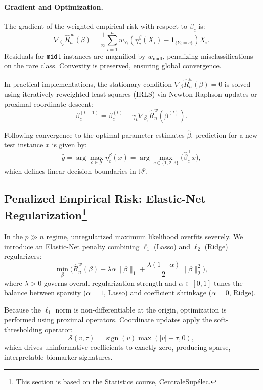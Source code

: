 \documentclass[a4paper,11pt]{paper}
\theoremstyle{plain}
\theoremstyle{definition}
\theoremstyle{remark}
\begin{document}
\paragraph{Gradient and Optimization.}
The gradient of the weighted empirical risk with respect to $\beta_c$ is:
$$
    \nabla_{\beta_c} \hat{R}_n^{\,w}(\beta) = \frac{1}{n} \sum_{i=1}^n w_{Y_i}\left( \eta_c^\beta(X_i) - \mathbf{1}_{\{Y_i = c\}} \right) X_i.
$$
Residuals for \texttt{midl} instances are magnified by $w_{\text{midl}}$, penalizing misclassifications on the rare class. Convexity is preserved, ensuring global convergence.

In practical implementations, the stationary condition $\nabla_\beta \hat R_n^w(\beta) = 0$ is solved using iteratively reweighted least squares (IRLS) via Newton-Raphson updates or proximal coordinate descent:
$$\beta_c^{(t+1)} = \beta_c^{(t)} - \gamma_t \nabla_{\beta_c} \hat R_n^w(\beta^{(t)}).$$

Following convergence to the optimal parameter estimates $\hat \beta$, prediction for a new test instance $x$ is given by:
$$\hat{y} = \arg\max_{c \in \mathcal{Y}} \eta_c^{\hat{\beta}}(x) = \arg\max_{c \in \{1, 2, 3\}} \big(\hat{\beta}_c^\top x\big),$$
which defines linear decision boundaries in $\mathbb{R}^p$.

\subsection{Penalized Empirical Risk: Elastic-Net Regularization\texorpdfstring{\protect\footnote{This section is based on the Statistics course, CentraleSupélec.}}{}}

In the $p \gg n$ regime, unregularized maximum likelihood overfits severely. We introduce an Elastic-Net penalty combining $\ell_1$ (Lasso) and $\ell_2$ (Ridge) regularizers:
$$\min_{\beta} \bigg( \hat R_n^w(\beta) + \lambda \alpha \|\beta\|_1 + \frac{\lambda (1 - \alpha)}{2} \|\beta\|_2^2 \bigg),$$
where $\lambda > 0$ governs overall regularization strength and $\alpha \in [0, 1]$ tunes the balance between sparsity ($\alpha = 1$, Lasso) and coefficient shrinkage ($\alpha = 0$, Ridge).

Because the $\ell_1$ norm is non-differentiable at the origin, optimization is performed using proximal operators. Coordinate updates apply the soft-thresholding operator:
$$\mathcal{S}(v, \tau) = \operatorname{sign}(v)\max(|v| - \tau, 0),$$
which drives uninformative coefficients to exactly zero, producing sparse, interpretable biomarker signatures.
\end{document}
